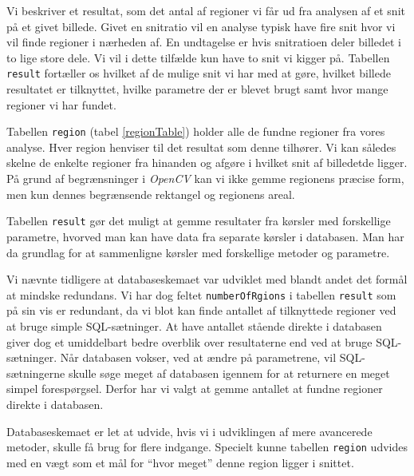 {Vi beskriver et resultat, som det antal af regioner vi får ud fra
analysen af et snit på et givet billede. Givet en snitratio vil en
analyse typisk have fire snit hvor vi vil finde regioner i nærheden af.
En undtagelse er hvis snitratioen deler billedet i to lige store dele.
Vi vil i dette tilfælde kun have to snit vi kigger på. Tabellen
\texttt{result} fortæller os hvilket af de mulige snit vi har med at
gøre, hvilket billede resultatet er tilknyttet, hvilke parametre der er
blevet brugt samt hvor mange regioner vi har fundet.

Tabellen \texttt{region} (tabel \ref{regionTable}) holder alle de fundne
regioner fra vores analyse. Hver region henviser til det resultat som
denne tilhører. Vi kan således skelne de enkelte regioner fra hinanden
og afgøre i hvilket snit af billedetde ligger.  På grund af
begrænsninger i \emph{OpenCV} kan vi ikke gemme regionens præcise form,
men kun dennes begrænsende rektangel og regionens areal.

Tabellen \texttt{result} gør det muligt at gemme resultater fra kørsler
med forskellige parametre, hvorved man kan have data fra separate
kørsler i databasen. Man har da grundlag for at sammenligne kørsler med
forskellige metoder og parametre.

Vi nævnte tidligere at databaseskemaet var udviklet med blandt andet det
formål at mindske redundans. Vi har dog feltet \texttt{numberOfRgions} i
tabellen \texttt{result} som på sin vis er redundant, da vi blot kan
finde antallet af tilknyttede regioner ved at bruge simple
SQL-sætninger. At have antallet stående direkte i databasen giver dog et
umiddelbart bedre overblik over resultaterne end ved at bruge
SQL-sætninger. Når databasen vokser, ved at ændre på parametrene, vil
SQL-sætningerne skulle søge meget af databasen igennem for at returnere
en meget simpel forespørgsel. Derfor har vi valgt at gemme antallet at
fundne regioner direkte i databasen.

Databaseskemaet er let at udvide, hvis vi i udviklingen af mere
avancerede metoder, skulle få brug for flere indgange. Specielt kunne
tabellen \texttt{region} udvides med en vægt som et mål for ``hvor
meget'' denne region ligger i snittet.

}
